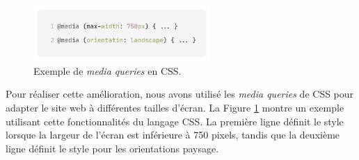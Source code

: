 \begin{figure}[H]
    \centering
    \includegraphics[width=0.6\textwidth]{assets/website2.png}
    \caption{Exemple de \textit{media queries} en CSS.}
    \label{fig:website2}
\end{figure}

Pour réaliser cette amélioration, nous avons utilisé les \textit{media queries} de CSS pour adapter le site web à différentes tailles d'écran.
La Figure \ref*{fig:website2} montre un exemple utilisant cette fonctionnalités du langage CSS.
La première ligne définit le style lorsque la largeur de l'écran est inférieure à 750 pixels, tandis que la deuxième ligne définit le style pour les orientations paysage.
